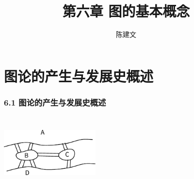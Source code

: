 \documentclass{beamer}
\theoremstyle{definition}
\theoremstyle{example}
\begin{document}
\begin{CJK*}{UTF8}{gbsn}
\newtheorem{definition1.1.1}{定义1.1.1}
\newtheorem{definition6.2.1}{定义6.2.1}
\newtheorem{definition6.2.2}{定义6.2.2}
\newtheorem{definition6.2.3}{定义6.2.3}
\newtheorem{definition6.2.4}{定义6.2.4}
\newtheorem{definition6.2.5}{定义6.2.5}
\newtheorem{definition6.2.6}{定义6.2.6}
\newtheorem{definition6.2.7}{定义6.2.7}
\newtheorem{definition6.2.8}{定义6.2.8}
\newtheorem{definition6.2.9}{定义6.2.9}
\newtheorem{definition6.2.10}{定义6.2.10}

\newtheorem{definition6.3.1}{定义6.3.1}
\newtheorem{definition6.3.2}{定义6.3.2}
\newtheorem{definition6.3.3}{定义6.3.3}
\newtheorem{definition6.3.4}{定义6.3.4}
\newtheorem{definition6.3.5}{定义6.3.5}
\newtheorem{theorem6.3.1}{定理6.3.1}





\newtheorem{definition6.4.1}{定义6.4.1}
\newtheorem{definition6.4.2}{定义6.4.2}
\newtheorem{definition6.4.3}{定义6.4.3}
\newtheorem{definition6.4.4}{定义6.4.4}
\newtheorem{definition6.4.5}{定义6.4.5}
\newtheorem{definition6.4.6}{定义6.4.6}
\newtheorem{definition6.4.7}{定义6.4.7}

\newtheorem{definition1}{Problem Statement}
\newtheorem{theorem6.4.1}{定理6.4.1}
\newtheorem{theorem6.4.2}{定理6.4.2}
\newtheorem{theorem6.4.3}{定理6.4.3}
\newtheorem{Thm1}{Theorem1}
\newtheorem{Thm2}{Theorem2}
\newtheorem{Thm3}{Theorem3}
\newtheorem{Thm4}{Theorem4}

\newtheorem{definition6.5.1}{定义6.5.1}
\newtheorem{definition6.5.2}{定义6.5.2}

\newtheorem{theorem6.5.1}{定理6.5.1}
\newtheorem{theorem6.5.2}{定理6.5.2}
\newtheorem{theorem6.5.3}{定理6.5.3}

\newtheorem{definition6.6.1}{定义6.6.1}
\newtheorem{theorem6.6.1}{定理6.6.1}
\newtheorem{theorem6.6.2}{定理6.6.2}
\newtheorem{theorem6.6.3}{定理6.6.3}
\newtheorem{theorem6.6.4}{引理6.6.1}



\newtheorem{theorem6.2.1}{定理6.2.1}
\newtheorem{theorem6.2.2}{推论6.2.1}
\newtheorem{example1}{例:}

\date{}
\author{陈建文}

\title{第六章 图的基本概念}
\begin{frame}
  \titlepage
\end{frame}
\section{图论的产生与发展史概述}
\begin{frame}
  \frametitle{6.1 图论的产生与发展史概述}
  \centering
\includegraphics[width=5cm,height=4cm]{konigsberg} 
\end{frame}


\end{CJK*}
\end{document}
